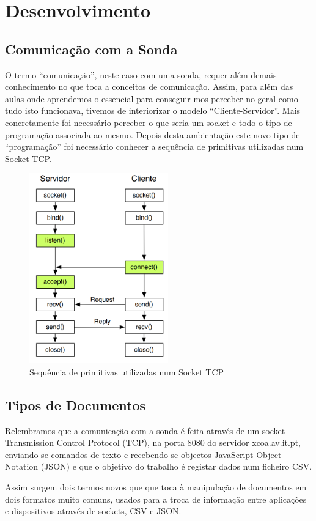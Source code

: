 \documentclass[a4paper,12pt]{report}
\begin{document}
\chapter{Desenvolvimento}
\label{desenvolvimento}


\section{Comunicação com a Sonda}
O termo “comunicação”, neste caso com uma sonda, requer além demais conhecimento no que toca a conceitos de comunicação. Assim, para além das aulas onde aprendemos o essencial para conseguir-mos perceber no geral como tudo isto funcionava, tivemos de interiorizar o modelo “Cliente-Servidor”. Mais concretamente foi necessário perceber o que seria um socket e todo o tipo de programação associada ao mesmo. Depois desta ambientação este novo tipo de “programação” foi necessário conhecer a sequência de primitivas utilizadas num Socket TCP.

\vspace{10mm}
\begin{figure}[h]
\center
\includegraphics[width=6cm]{imagens/sockettcp.png}
\caption{Sequência de primitivas utilizadas num Socket TCP}
\end{figure}
\clearpage

\section{Tipos de Documentos}
Relembramos que a comunicação com a sonda é feita através de um socket Transmission Control Protocol (TCP), na porta 8080 do servidor xcoa.av.it.pt, enviando-se comandos de texto e recebendo-se objectos JavaScript Object Notation (JSON) e que o objetivo do trabalho é registar dados num ficheiro CSV.\par Assim surgem dois termos novos que que toca à manipulação de documentos em dois formatos muito
comuns, usados para a troca de informação entre aplicações e dispositivos através de sockets, CSV e JSON.\par
\end{document}
